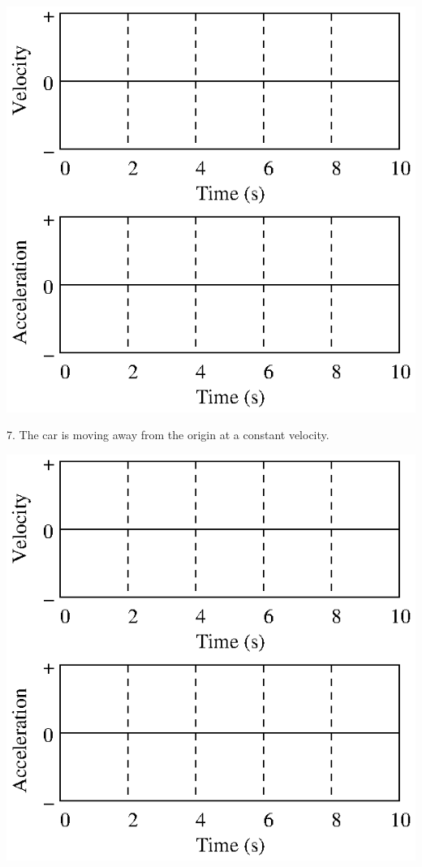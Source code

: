 \vspace{0.3cm}
{\par\centering \includegraphics{changing_fig12.eps} \par}
\vspace{0.3cm}

7. The car is moving away from the origin at a constant velocity.

\vspace{0.3cm}
{\par\centering \includegraphics{changing_fig12.eps} \par}
\vspace{0.3cm}

